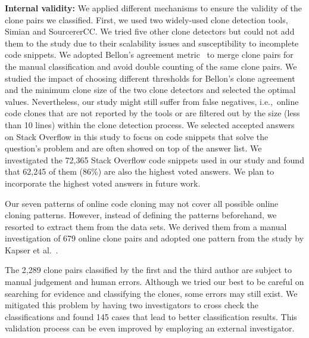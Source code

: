 \documentclass[10pt,journal,compsoc]{IEEEtran}
\begin{document}
\textbf{Internal validity:} 
We applied different mechanisms to ensure the validity of the clone pairs we
classified.  First, we used two widely-used clone detection tools, Simian and
SourcererCC.  We tried five other clone detectors but could not add them to the
study due to their scalability issues and susceptibility to incomplete code
snippets. We adopted Bellon's agreement metric~\cite{Bellon2007} to merge clone
pairs for the manual classification and avoid double counting of the same clone
pairs. We studied the impact of choosing different thresholds for Bellon's clone agreement and the minimum clone
size of the two clone detectors and selected the optimal values.
Nevertheless, our study might still suffer from false negatives,
i.e.,~online code clones that are not reported by the tools or are filtered out
by the size (less than 10 lines) within the clone detection process. We selected
accepted answers on Stack Overflow in this study to focus on code snippets that
solve the question's problem and are often showed on top of the answer list.
We investigated the 72,365 Stack Overflow code snippets used in our study and
found that 62,245 of them (86\%) are also the highest voted answers.
We plan to incorporate the highest voted answers in future work.



Our seven patterns of online code cloning may not cover all possible online
cloning patterns. However, instead of defining the patterns beforehand, we
resorted to extract them from the data sets. We derived them from a manual
investigation of 679 online clone pairs and adopted one pattern from the study
by Kapser et al.~\cite{Kapser2003}.

The 2,289 clone pairs classified by the first and the third author are subject
to manual judgement and human errors.  Although we tried our best to be careful
on searching for evidence and classifying the clones, some errors may still
exist. We mitigated this problem by having two investigators to cross check the
classifications and found 145 cases that lead to better classification results.
This validation process can be even improved by employing an external
investigator. 
\end{document}
